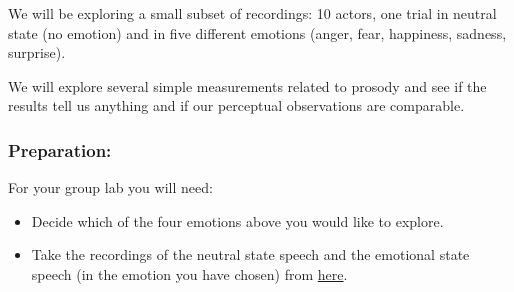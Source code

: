 \documentclass{../labbook}
\begin{document}
We will be exploring a small subset of recordings: 10 actors, one trial in neutral state (no emotion) and in five different emotions (anger, fear, happiness, sadness, surprise).

We will explore several simple measurements related to prosody and see if the results tell us anything and if our perceptual observations are comparable. 


\subsubsection*{Preparation:}
For your group lab you will need:
\begin{itemize}
    \item Decide which of the four emotions above you would like to explore.
    \item Take the recordings of the neutral state speech and the emotional state speech (in the emotion you have chosen) from \href{https://drive.google.com/drive/folders/11jGlJaEVkZL6PLsL-Si8RY4DbsP409JC?usp=sharing}{here}.
\end{itemize}
\end{document}
